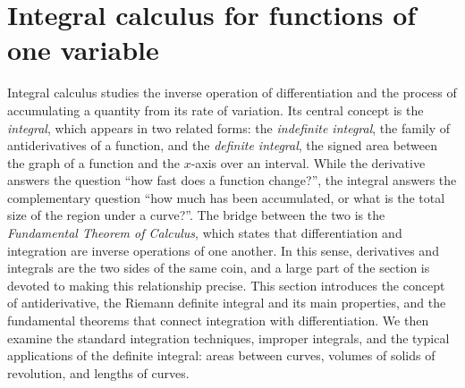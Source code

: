 \documentclass[11pt,a4paper]{article}
\theoremstyle{definition} \newtheorem{definition}{Definition} \theoremstyle{plain} \newtheorem{theorem}{Theorem}
\begin{document}
\section{Integral calculus for functions of one variable}\label{sec:integral}
Integral calculus studies the inverse operation of differentiation and the process of accumulating a quantity from its rate of variation.
Its central concept is the \emph{integral}, which appears in two related forms: the \emph{indefinite integral}, the family of antiderivatives of a function, and the \emph{definite integral}, the signed area between the graph of a function and the $x$-axis over an interval.
While the derivative answers the question ``how fast does a function change?'', the integral answers the complementary question ``how much has been accumulated, or what is the total size of the region under a curve?''.
The bridge between the two is the \emph{Fundamental Theorem of Calculus}, which states that differentiation and integration are inverse operations of one another. In this sense, derivatives and integrals are the two sides of the same coin, and a large part of the section is devoted to making this relationship precise.
This section introduces the concept of antiderivative, the Riemann definite integral and its main properties, and the fundamental theorems that connect integration with differentiation.
We then examine the standard integration techniques, improper integrals, and the typical applications of the definite integral: areas between curves, volumes of solids of revolution, and lengths of curves.
\end{document}
